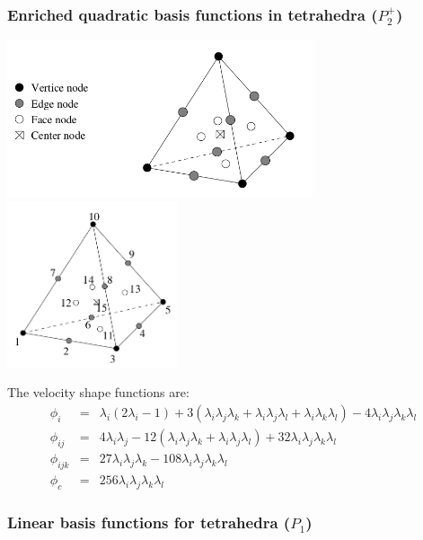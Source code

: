 \subsubsection{Enriched quadratic basis functions in tetrahedra ($P_2^+$)}

\includegraphics[width=9cm]{images/crouzeix-raviart/p2pp1_3D1}
\includegraphics[width=5cm]{images/crouzeix-raviart/p2pp1_3D2}

The velocity shape functions are:
\begin{eqnarray}
\phi_i &=& \lambda_i(2\lambda_i-1) + 3 (\lambda_i\lambda_j \lambda_k + \lambda_i\lambda_j\lambda_l + \lambda_i\lambda_k\lambda_l) -4 \lambda_i\lambda_j\lambda_k\lambda_l \\
\phi_{ij} &=& 4\lambda_i\lambda_j - 12( \lambda_i\lambda_j\lambda_k+\lambda_i\lambda_j\lambda_l  ) +32 \lambda_i\lambda_j\lambda_k \lambda_l \\
\phi_{ijk} &=& 27  \lambda_i\lambda_j\lambda_k - 108 \lambda_i\lambda_j\lambda_k \lambda_l \\
\phi_c &=& 256 \lambda_i\lambda_j\lambda_k\lambda_l
\end{eqnarray}


\subsubsection{Linear basis functions for tetrahedra ($P_1$)}

